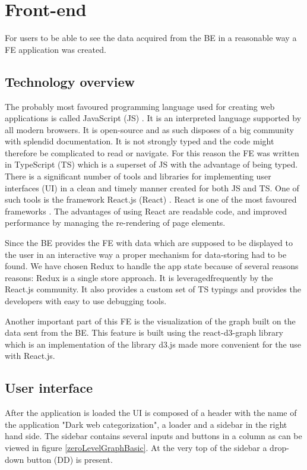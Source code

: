 \section{Front-end}
For users to be able to see the data acquired from the BE in a reasonable way a FE application was created. 
\subsection{Technology overview}
The probably most favoured programming language used for creating web applications \cite{jsGithut} is called JavaScript (JS) \cite{javaScript}. It is an interpreted language supported by all modern browsers. It is open-source and as such disposes of a big community with splendid documentation. It is not strongly typed and the code might therefore be complicated to read or navigate. For this reason the FE was written in TypeScript (TS) \cite{typeScript} which is a superset of JS with the advantage of being typed. There is a significant number of tools and libraries for implementing user interfaces (UI) in a clean and timely manner created for both JS and TS. One of such tools is the framework React.js (React) \cite{react}. React is one of the most favoured frameworks \cite{reactPopularity}. The advantages of using React are readable code, and improved performance by managing the re-rendering of page elements.

Since the BE provides the FE with data which are supposed to be displayed to the user in an interactive way a proper mechanism for data-storing had to be found. We have chosen Redux \cite{redux} to handle the app state because of several reasons reasons: Redux is a single store approach. It is leveragedfrequently by the React.js community. It also provides a custom set of TS typings and provides the developers with easy to use debugging tools. 

Another important part of this FE is the visualization of the graph built on the data sent from the BE. This feature is built using the react-d3-graph library \cite{reactD3Graph} which is 
an implementation of the library d3.js \cite{d3} made more convenient for the use with React.js. 

\subsection{User interface}
After the application is loaded the UI is composed of a header with the name of the application "Dark web categorization", a loader and a sidebar in the right hand side. The sidebar contains several inputs and buttons in a column as can be viewed in figure \ref{zeroLevelGraphBasic}. At the very top of the sidebar a drop-down button (DD) is present. 

